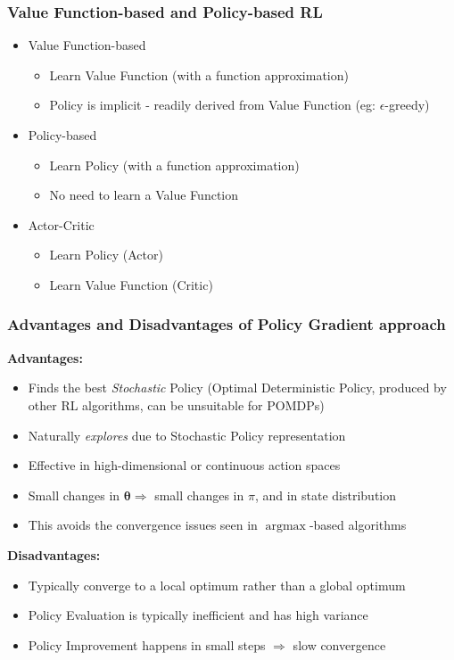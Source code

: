 \documentclass[handout]{beamer}
\DeclareMathOperator*{\argmax}{argmax}
\begin{document}
\begin{frame}
\frametitle{Value Function-based and Policy-based RL}
\pause
\begin{itemize}[<+->]
\item Value Function-based
\begin{itemize}
\item Learn Value Function (with a function approximation)
\item Policy is implicit - readily derived from Value Function (eg: $\epsilon$-greedy)
\end{itemize}
\item Policy-based
\begin{itemize}
\item Learn Policy (with a function approximation)
\item No need to learn a Value Function
\end{itemize}
\item Actor-Critic
\begin{itemize}
\item Learn Policy (Actor)
\item Learn Value Function (Critic)
\end{itemize}
\end{itemize}
\end{frame}

\begin{frame}
\frametitle{Advantages and Disadvantages of Policy Gradient approach}
\pause
{\bf Advantages:}
\pause
\begin{itemize}[<+->]
\item Finds the best {\em Stochastic} Policy (Optimal Deterministic Policy, produced by other RL algorithms, can be unsuitable for POMDPs)
\item Naturally {\em explores} due to Stochastic Policy representation
\item Effective in high-dimensional or continuous action spaces
\item Small changes in $\bm{\theta} \Rightarrow$ small changes in $\pi$, and in state distribution
\item This avoids the convergence issues seen in $\argmax$-based algorithms 
\end{itemize}
\pause
{\bf Disadvantages:}
\pause
\begin{itemize}[<+->]
\item Typically converge to a local optimum rather than a global optimum
\item Policy Evaluation is typically inefficient and has high variance
\item Policy Improvement happens in small steps $\Rightarrow$ slow convergence
\end{itemize}
\end{frame}
\end{document}
